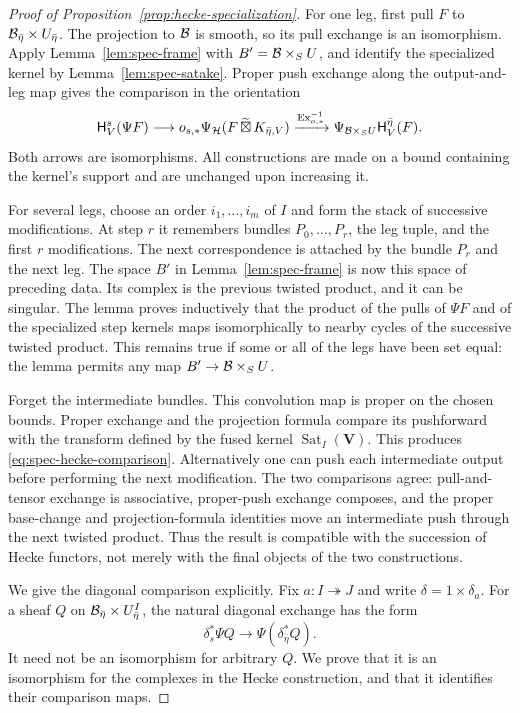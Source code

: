 \begin{proof}[Proof of Proposition~\ref{prop:hecke-specialization}]
For one leg, first pull $F$ to $\mathcal B_{\bar\eta}\times U_{\bar\eta}$.
The projection to $\mathcal B$ is smooth, so its pull exchange is an
isomorphism.  Apply Lemma~\ref{lem:spec-frame} with
$B'=\mathcal B\times_S U$, and identify the specialized kernel by
Lemma~\ref{lem:spec-satake}.  Proper push exchange along the
output-and-leg map gives the comparison in the orientation
\[
 \mathsf H^s_V(\Psi F)
   \longrightarrow o_{s,*}\Psi_{\mathcal H}
                     (F\,\widetilde\boxtimes\,K_{\bar\eta,V})
   \xrightarrow{\operatorname{Ex}_{o,*}^{-1}}
                     \Psi_{\mathcal B\times_SU}\mathsf H^{\bar\eta}_V(F).
\]
Both arrows are isomorphisms.  All constructions are made on a bound
containing the kernel's support and are unchanged upon increasing it.

For several legs, choose an order $i_1,\ldots,i_m$ of $I$ and form the
stack of successive modifications.  At step $r$ it remembers bundles
$P_0,\ldots,P_r$, the leg tuple, and the first $r$ modifications.
The next correspondence is attached by the bundle $P_r$ and the next
leg.  The space $B'$ in Lemma~\ref{lem:spec-frame} is now this space
of preceding data.  Its complex is the previous twisted product, and
it can be singular.  The lemma proves inductively that the product of
the pulls of $\Psi F$ and of the specialized step kernels maps
isomorphically to nearby cycles of the successive twisted product.
This remains true if some or all of the legs have been set equal:
the lemma permits any map $B'\to\mathcal B\times_S U$.

Forget the intermediate bundles.  This convolution map is proper on the
chosen bounds.  Proper exchange and the projection formula compare its
pushforward with the transform defined by the fused kernel
$\operatorname{Sat}_I(\boldsymbol V)$.  This produces
\eqref{eq:spec-hecke-comparison}.  Alternatively one can push each
intermediate output before performing the next modification.  The two
comparisons agree: pull-and-tensor exchange is associative, proper-push
exchange composes, and the proper base-change and projection-formula
identities move an intermediate push through the next twisted product.
Thus the result is compatible with the succession of Hecke functors,
not merely with the final objects of the two constructions.

We give the diagonal comparison explicitly.  Fix
$a:I\twoheadrightarrow J$ and write $\delta=1\times\delta_a$.
For a sheaf $Q$ on $\mathcal B_{\bar\eta}\times U_{\bar\eta}^I$, the
natural diagonal exchange has the form
\begin{equation}\label{eq:spec-diagonal-exchange}
        \delta_s^*\Psi Q\longrightarrow\Psi(\delta_{\bar\eta}^*Q).
\end{equation}
It need not be an isomorphism for arbitrary $Q$.  We prove that it is
an isomorphism for the complexes in the Hecke construction, and that it
identifies their comparison maps.


\end{proof}

